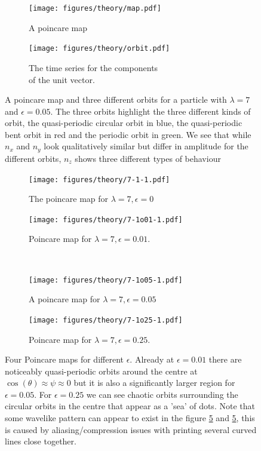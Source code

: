 \begin{figure}[H]
\centering
\begin{subfigure}[b]{0.45\textwidth}
\texttt{[image: figures/theory/map.pdf]}
\caption{A poincare map}\label{fig:orbitmap}
\end{subfigure}\hspace{1em}%
\begin{subfigure}[b]{0.45\textwidth}
\texttt{[image: figures/theory/orbit.pdf]}
\caption{The time series for the components \\ of the unit vector.}\label{fig:orbitparams}
\end{subfigure}
\caption{A poincare map and three different orbits for a particle with $\lambda=7$ and $\epsilon=0.05$. The three orbits highlight the three different kinds of orbit, the quasi-periodic circular orbit in blue, the quasi-periodic bent orbit in red and the periodic orbit in green. We see that while $n_x$ and $n_y$ look qualitatively similar but differ in amplitude for the different orbits, $n_z$ shows three different types of behaviour}
\label{fig:orbittypes}
\end{figure}



\begin{figure}[H]
\centering
\begin{subfigure}[3a]{0.40\textwidth}
\texttt{[image: figures/theory/7-1-1.pdf]}
\caption{The poincare map for $\lambda = 7, \epsilon = 0$}\label{fig:orbitmap1}
\end{subfigure}\hspace{1em}%
\begin{subfigure}[3b]{0.40\textwidth}
\texttt{[image: figures/theory/7-1o01-1.pdf]}
\caption{Poincare map for $\lambda = 7, \epsilon = 0.01$.}\label{fig:orbitmap2}
\end{subfigure} \\
\begin{subfigure}[3a]{0.40\textwidth}
\texttt{[image: figures/theory/7-1o05-1.pdf]}
\caption{A poincare map for $\lambda = 7, \epsilon = 0.05$}\label{fig:orbitmap3}
\end{subfigure}\hspace{1em}%
	\begin{subfigure}[3b]{0.40\textwidth}
\texttt{[image: figures/theory/7-1o25-1.pdf]}
\caption{Poincare map for $\lambda = 7, \epsilon = 0.25$.}\label{fig:orbitmap4}
\end{subfigure} 
\caption{Four Poincare maps for different $\epsilon$. Already at $\epsilon = 0.01$ there are noticeably quasi-periodic 
orbits around the centre at $\cos(\theta) \approx \psi \approx 0$ but it is also a significantly larger region for $\epsilon = 0.05$. For $\epsilon = 0.25$ we can see chaotic orbits surrounding the circular orbits in the centre that appear as a 'sea' of dots. Note that some wavelike pattern can appear to exist in the figure \ref{fig:orbitmap2} and  \ref{fig:orbitmap2}, this is caused by aliasing/compression issues with printing several curved lines close together.}\label{fig:orbitmaps}
\end{figure}

